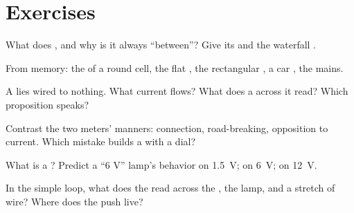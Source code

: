 \section{Exercises}

\begin{exercise}[$\star$]\label{exo:g8:voltage-voltmeter:1}
What does  , and why is it always ``between''?
Give its  and the waterfall .
\end{exercise}

\begin{exercise}[$\star$]\label{exo:g8:voltage-voltmeter:2}
From memory: the  of a round cell, the flat ,
the rectangular , a car , the mains.
\end{exercise}

\begin{exercise}[$\star$]\label{exo:g8:voltage-voltmeter:3}
A  lies wired to nothing. What current flows? What does
a  across it read? Which proposition speaks?
\end{exercise}

\begin{exercise}[$\star$]\label{exo:g8:voltage-voltmeter:4}
Contrast the two meters' manners: connection, road-breaking,
opposition to current. Which mistake builds a 
with a dial?
\end{exercise}

\begin{exercise}[$\star$]\label{exo:g8:voltage-voltmeter:5}
What is a ? Predict a ``6 V'' lamp's behavior
on \qty{1.5}{V}; on \qty{6}{V}; on \qty{12}{V}.
\end{exercise}

\begin{exercise}[$\star$]\label{exo:g8:voltage-voltmeter:6}
In the simple loop, what does the  read across the
, the lamp, and a stretch of wire? Where does the push
live?
\end{exercise}

